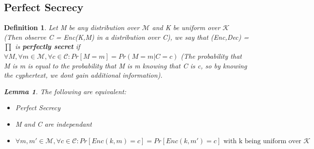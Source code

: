 \documentclass[11pt, a4paper]{article}
\newtheorem{defn}{Definition}
\newtheorem{lem}{Lemma}
\begin{document}
\subsection{Perfect Secrecy}
\begin{defn}
Let M be any distribution over $\mathcal{M}$ and K be uniform over $\mathcal{K}$ (Then observe C = Enc(K,M) in a distribution over C), we say that (Enc,Dec) = $\prod$ is \textbf{perfectly secret}
if $\forall M, \forall m \in \mathcal{M}, \forall c \in \mathcal{C}: Pr[M=m] = Pr(M=m | C=c)$ (The probability that M is m is equal to the probability that M is m knowing that C is c, so by knowing the cyphertext, we dont gain additional information).
\begin{lem}
The following are equivalent:
\begin{itemize}
    \item Perfect Secrecy
    \item M and C are independant
    \item $\forall m,m' \in \mathcal{M}, \forall c \in \mathcal{C}: Pr[Enc(k,m) = c] = Pr[Enc(k,m') = c] \text{ with k being uniform over } \mathcal{K}$
\end{itemize}
\end{lem}
\end{defn}
\end{document}
